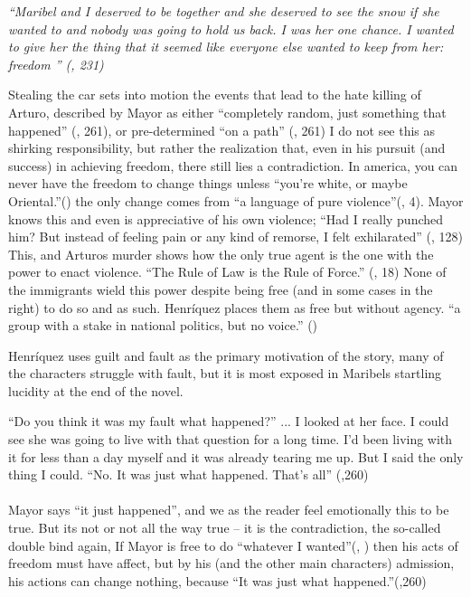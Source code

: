 \documentclass{article}
\begin{document}
\textit{``Maribel and I deserved to be together and she deserved to see the snow if she wanted to and nobody was going to hold us back. I was her one chance. I wanted to give her the thing that it seemed like everyone else wanted to keep from her: freedom '' (\cite{Henriquez2014-sh}, 231)}

Stealing the car sets into motion the events that lead to the hate killing of Arturo, described by Mayor as either ``completely random, just something that happened'' (\cite{Henriquez2014-sh}, 261), or pre-determined ``on a path'' (\cite{Henriquez2014-sh}, 261) I do not see this as shirking responsibility, but rather the realization that, even in his pursuit (and success) in achieving freedom, there still lies a contradiction. In america, you can never have the freedom to change things unless ``you're white, or maybe Oriental.''(\cite{Henriquez2014-sh}) the only change comes from ``a language of pure violence''(\cite{wretched}, 4). Mayor knows this and even is appreciative of his own violence; ``Had I really punched him? But instead of feeling pain or any kind of remorse, I felt exhilarated'' (\cite{Henriquez2014-sh}, 128) This, and Arturos murder shows how the only true agent is the one with the power to enact violence. ``The Rule of Law is the Rule of Force.'' (\cite{loves-bdy}, 18) None of the immigrants wield this power despite being free (and in some cases in the right) to do so and as such. Henríquez places them as free but without agency. ``a group with a stake in national politics, but no voice.'' (\cite{Lutes_Travis_2021})

Henríquez uses guilt and fault as the primary motivation of the story, many of the characters struggle with fault, but it is most exposed in Maribels startling lucidity at the end of the novel.

\noindent\linebreak
``Do you think it was my fault what happened?'' 
\noindent\linebreak
...
\noindent\linebreak
I looked at her face. I could see she was going to live with that question for a long time. I'd been living with it for less than a day myself and it was already tearing me up. But I said the only thing I could. ``No. It was just what happened. That's all'' (\cite{Henriquez2014-sh},260)
\paragraph{}
Mayor says ``it just happened'', and we as the reader feel emotionally this to be true. But its not or not all the way true -- it is the contradiction, the so-called double bind again, If Mayor is free to do ``whatever I wanted''(\cite{Henriquez2014-sh}, ) then his acts of freedom must have affect, but by his (and the other main characters) admission, his actions can change nothing, because ``It was just what happened.''(\cite{Henriquez2014-sh},260)
\end{document}
